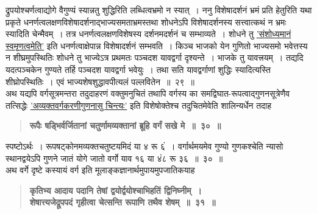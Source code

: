 \documentclass[11pt, openany]{book}
\begin{document}
\begin{sloppypar}
\noindent द्रुपयोश्चर्णत्वाद्योगे वैगुण्यं स्यान्नतु शुद्धिरिति लब्धित्वभ्रमो न स्यात्~। ननु विशेषादर्शनं भ्रमं प्रति हेतुरिति यथा प्रकृते धनर्णत्वलक्षणविशेषादर्शनाद्भाज्यसमताभ्रमस्तथा शोधनेऽपि विशेषादर्शनस्य सत्त्वात्कथं न भ्रमः स्यादिति चेन्मैवम्~। तत्र धनर्णत्वलक्षणविशेषस्य दर्शनमदर्शनं च सम्भाव्यते~। शोधने तु \hyperref[1.7]{'संशोध्यमानं स्वमृणत्वमेति'} इति धनर्णत्वाक्षेपान्न विशेषादर्शनं सम्भवति~। किञ्च भाजको येन गुणितो भाज्यसमो भवेत्तस्य न शीघ्रमुपस्थितिः शोधने तु भाज्येऽत्र प्रथमतः पञ्चदश यावद्वर्गा दृश्यन्ते~। भाजके तु यावत्त्रयम्~। तद्यदि यदत्पञ्चकेन गुण्यते तर्हि पञ्चदश यावद्वर्गा भवेयुः~। तथा सति यावद्वर्गाणां शुद्धिः स्यादित्यस्ति शीघ्रोपस्थितिः~। एवं भाज्यशेषशुद्धावपीत्यलं पल्लवितेन~॥~२९~॥\\

{\small अथ यद्यपि वर्गसूत्रमन्तरा तदुदाहरणं वक्तुमनुचितं तथापि वर्गस्य का समद्विघात-रूपत्वाद्गुणनसूत्रेणैव तत्सिद्धेः \hyperref[3.27]{'अव्यक्तवर्गकरणीगुणनासु चिन्त्यः'} इति विशेषोक्तेश्च तदुचितमेवेति शालिन्यर्धेन तदाह\textendash }

 \label{3.30}
\begin{quote}
{\large \textbf{{\color{purple}रूपैः षड्भिर्वर्जितानां चतुर्णामव्यक्तानां ब्रूहि वर्गं सखे मे~॥~३०~॥}}}
\end{quote}

स्पष्टोऽर्थः~। रूपषट्कोनमव्यक्तचतुष्टयमिदं या ४ रू ६ं~। वर्गार्थमयमेव गुण्यो गुणकश्चेति न्यासो  \;स्थानद्वयेऽपि गुणने जातं \; योगे जातो वर्गो याव १६ या ४ं८ रू ३६~॥~३०~॥\\

{\small अथ वर्गे दृष्टे कस्यायं वर्ग इति मूलाङ्कज्ञानार्थमुपायमुपजातिकयाह\textendash }

 \label{3.31}
\begin{quote}
{\large \textbf{{\color{purple}कृतिभ्य आदाय पदानि तेषां द्वयोर्द्वयोश्चाभिहतिं द्विनिघ्नीम्~।\\
शेषात्त्यजेद्रूपपदं गृहीत्वा चेत्सन्ति रूपाणि तथैव शेषम्~॥~३१~॥}}}
\end{quote}


\end{sloppypar}
\end{document}
